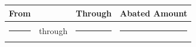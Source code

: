 \noindent
\begin{tabularx}{\textwidth}{@{}X c X r@{}}
\toprule
\textbf{From} & & \textbf{Through} & \textbf{Abated Amount} \\
\midrule
\rule{4cm}{0.4pt} & through & \rule{4cm}{0.4pt} & \rule{2.5cm}{0.4pt} \\
\bottomrule
\end{tabularx}
